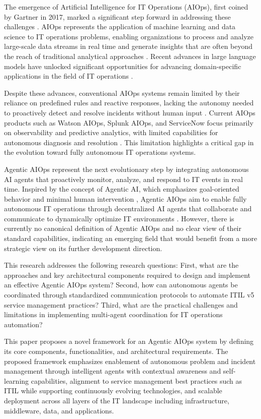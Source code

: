 \documentclass{article}
\begin{document}
The emergence of Artificial Intelligence for IT Operations (AIOps), first coined by Gartner in 2017, marked a significant step forward in addressing these challenges \cite{notaro2021}. AIOps represents the application of machine learning and data science to IT operations problems, enabling organizations to process and analyze large-scale data streams in real time and generate insights that are often beyond the reach of traditional analytical approaches \cite{bogatinovski2021}. Recent advances in large language models have unlocked significant opportunities for advancing domain-specific applications in the field of IT operations \cite{liu2024}.

Despite these advances, conventional AIOps systems remain limited by their reliance on predefined rules and reactive responses, lacking the autonomy needed to proactively detect and resolve incidents without human input \cite{dang2019}. Current AIOps products such as Watson AIOps, Splunk AIOps, and ServiceNow focus primarily on observability and predictive analytics, with limited capabilities for autonomous diagnosis and resolution \cite{onkamo2023}. This limitation highlights a critical gap in the evolution toward fully autonomous IT operations systems.

Agentic AIOps represent the next evolutionary step by integrating autonomous AI agents that proactively monitor, analyze, and respond to IT events in real time. Inspired by the concept of Agentic AI, which emphasizes goal-oriented behavior and minimal human intervention \cite{acharya2025}, Agentic AIOps aim to enable fully autonomous IT operations through decentralized AI agents that collaborate and communicate to dynamically optimize IT environments \cite{piccialli2025}. However, there is currently no canonical definition of Agentic AIOps and no clear view of their standard capabilities, indicating an emerging field that would benefit from a more strategic view on its further development direction.

This research addresses the following research questions: First, what are the approaches and key architectural components required to design and implement an effective Agentic AIOps system? Second, how can autonomous agents be coordinated through standardized communication protocols to automate ITIL v5 service management practices? Third, what are the practical challenges and limitations in implementing multi-agent coordination for IT operations automation?

This paper proposes a novel framework for an Agentic AIOps system by defining its core components, functionalities, and architectural requirements. The proposed framework emphasizes enablement of autonomous problem and incident management through intelligent agents with contextual awareness and self-learning capabilities, alignment to service management best practices such as ITIL while supporting continuously evolving technologies, and scalable deployment across all layers of the IT landscape including infrastructure, middleware, data, and applications.
\end{document}
